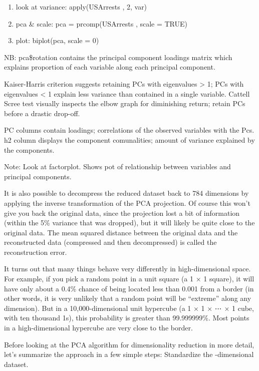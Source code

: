 \documentclass[]{book}
\providecommand{\tightlist}{%
  \setlength{\itemsep}{0pt}\setlength{\parskip}{0pt}}
\theoremstyle{definition}
\theoremstyle{definition}
\theoremstyle{definition}
\theoremstyle{remark}
\begin{document}
\begin{enumerate}
\def\labelenumi{\arabic{enumi})}
\tightlist
\item
  look at variance: apply(USArrests , 2, var)
\item
  pca \& scale: pca = prcomp(USArrests , scale = TRUE)
\item
  plot: biplot(pca, scale = 0)
\end{enumerate}

NB: pca\$rotation contains the principal component loadings matrix which
explains proportion of each variable along each principal component.

Kaiser-Harris criterion suggests retaining PCs with eigenvalues
\textgreater{} 1; PCs with eigenvalues \textless{} 1 explain less
variance than contained in a single variable. Cattell Scree test
visually inspects the elbow graph for diminishing return; retain PCs
before a drastic drop-off.

PC columns contain loadings; correlations of the observed variables with
the Pcs. h2 column displays the component comunalities; amount of
variance explained by the components.

Note: Look at factorplot. Shows pot of relationship between variables
and principal components.

It is also possible to decompress the reduced dataset back to 784
dimensions by applying the inverse transformation of the PCA projection.
Of course this won't give you back the original data, since the
projection lost a bit of information (within the 5\% variance that was
dropped), but it will likely be quite close to the original data. The
mean squared distance between the original data and the reconstructed
data (compressed and then decompressed) is called the reconstruction
error.

It turns out that many things behave very differently in
high-dimensional space. For example, if you pick a random point in a
unit square (a 1 × 1 square), it will have only about a 0.4\% chance of
being located less than 0.001 from a border (in other words, it is very
unlikely that a random point will be ``extreme'' along any dimension).
But in a 10,000-dimensional unit hypercube (a 1 × 1 × ⋯ × 1 cube, with
ten thousand 1s), this probability is greater than 99.999999\%. Most
points in a high-dimensional hypercube are very close to the border.

Before looking at the PCA algorithm for dimensionality reduction in more
detail, let's summarize the approach in a few simple steps: Standardize
the -dimensional dataset.
\end{document}
